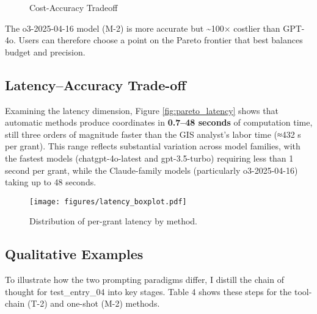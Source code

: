 \begin{figure}
\centering
{}
\caption{Cost-Accuracy Tradeoff}\label{fig:pareto_cost}
\end{figure}

The o3-2025-04-16 model (M-2) is more accurate but \textasciitilde100×
costlier than GPT-4o. Users can therefore choose a point on the Pareto
frontier that best balances budget and precision.

\subsection{Latency--Accuracy
Trade-off}\label{latencyaccuracy-trade-off}

Examining the latency dimension, Figure \ref{fig:pareto_latency} shows
that automatic methods produce coordinates in \textbf{0.7--48 seconds}
of computation time, still three orders of magnitude faster than the GIS
analyst's labor time (≈432 s per grant). This range reflects substantial
variation across model families, with the fastest models
(chatgpt-4o-latest and gpt-3.5-turbo) requiring less than 1 second per
grant, while the Claude-family models (particularly o3-2025-04-16)
taking up to 48 seconds.

\begin{figure}[H]
\centering
\texttt{[image: figures/latency\_boxplot.pdf]}
\caption{Distribution of per-grant latency by method.}
\label{fig:latency_box}
\end{figure}

\subsection{Qualitative Examples}\label{qualitative-examples}

To illustrate how the two prompting paradigms differ, I distill the
chain of thought for test\_entry\_04 into key stages. Table 4 shows
these steps for the tool-chain (T-2) and one-shot (M-2) methods.

